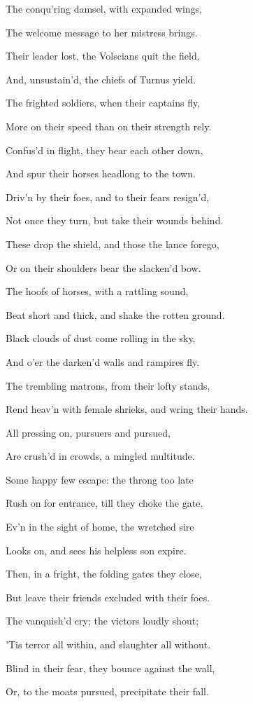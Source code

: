 The conqu’ring damsel, with expanded wings,

The welcome message to her mistress brings.

Their leader lost, the Volscians quit the field,

And, unsustain’d, the chiefs of Turnus yield.

The frighted soldiers, when their captains fly,

More on their speed than on their strength rely.

Confus’d in flight, they bear each other down,

And spur their horses headlong to the town.

Driv’n by their foes, and to their fears resign’d,

Not once they turn, but take their wounds behind.

These drop the shield, and those the lance forego,

Or on their shoulders bear the slacken’d bow.

The hoofs of horses, with a rattling sound,

Beat short and thick, and shake the rotten ground.

Black clouds of dust come rolling in the sky,

And o’er the darken’d walls and rampires fly.

The trembling matrons, from their lofty stands,

Rend heav’n with female shrieks, and wring their hands.

All pressing on, pursuers and pursued,

Are crush’d in crowds, a mingled multitude.

Some happy few escape: the throng too late

Rush on for entrance, till they choke the gate.

Ev’n in the sight of home, the wretched sire

Looks on, and sees his helpless son expire.

Then, in a fright, the folding gates they close,

But leave their friends excluded with their foes.

The vanquish’d cry; the victors loudly shout;

’Tis terror all within, and slaughter all without.

Blind in their fear, they bounce against the wall,

Or, to the moats pursued, precipitate their fall.

